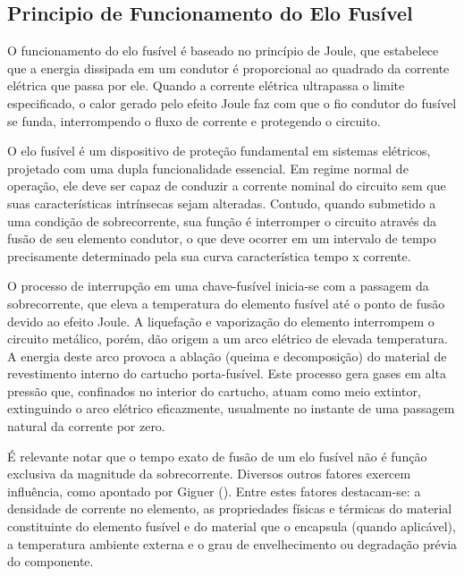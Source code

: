 \documentclass[oneside,openright,12pt]{ufsm_2021} %
\begin{document}
\subsection{Principio de Funcionamento do Elo Fusível}

\par O funcionamento do elo fusível é baseado no princípio de Joule, que estabelece que a energia dissipada em um condutor é proporcional ao quadrado da corrente elétrica que passa por ele. Quando a corrente elétrica ultrapassa o limite especificado, o calor gerado pelo efeito Joule faz com que o fio condutor do fusível se funda, interrompendo o fluxo de corrente e protegendo o circuito.

\par O elo fusível é um dispositivo de proteção fundamental em sistemas elétricos, projetado com uma dupla funcionalidade essencial. Em regime normal de operação, ele deve ser capaz de conduzir a corrente nominal do circuito sem que suas características intrínsecas sejam alteradas. Contudo, quando submetido a uma condição de sobrecorrente, sua função é interromper o circuito através da fusão de seu elemento condutor, o que deve ocorrer em um intervalo de tempo precisamente determinado pela sua curva característica tempo x corrente.

\par O processo de interrupção em uma chave-fusível inicia-se com a passagem da sobrecorrente, que eleva a temperatura do elemento fusível até o ponto de fusão devido ao efeito Joule. A liquefação e vaporização do elemento interrompem o circuito metálico, porém, dão origem a um arco elétrico de elevada temperatura. A energia deste arco provoca a ablação (queima e decomposição) do material de revestimento interno do cartucho porta-fusível. Este processo gera gases em alta pressão que, confinados no interior do cartucho, atuam como meio extintor, extinguindo o arco elétrico eficazmente, usualmente no instante de uma passagem natural da corrente por zero.

\par É relevante notar que o tempo exato de fusão de um elo fusível não é função exclusiva da magnitude da sobrecorrente. Diversos outros fatores exercem influência, como apontado por Giguer (\citeyear{giguer_protecao_1970}). Entre estes fatores destacam-se: a densidade de corrente no elemento, as propriedades físicas e térmicas do material constituinte do elemento fusível e do material que o encapsula (quando aplicável), a temperatura ambiente externa e o grau de envelhecimento ou degradação prévia do componente.
\end{document}
